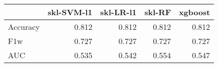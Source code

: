 \begin{tabular}{lrrrr}
\toprule
{} &  skl-SVM-l1 &  skl-LR-l1 &  skl-RF &  xgboost \\
\midrule
Accuracy &       0.812 &      0.812 &   0.812 &    0.812 \\
F1w      &       0.727 &      0.727 &   0.727 &    0.727 \\
AUC      &       0.535 &      0.542 &   0.554 &    0.547 \\
\bottomrule
\end{tabular}
